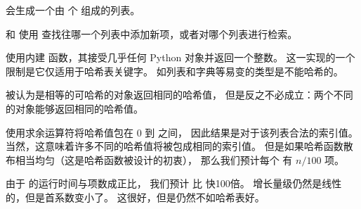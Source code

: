 
 会生成一个由  个  组成的列表。


 和  使用  查找往哪一个列表中添加新项，或者对哪个列表进行检索。



 使用内建  函数，其接受几乎任何 Python 对象并返回一个整数。
这一实现的一个限制是它仅适用于哈希表关键字。 如列表和字典等易变的类型是不能哈希的。


被认为是相等的可哈希的对象返回相同的哈希值，
但是反之不必成立：两个不同的对象能够返回相同的哈希值。


 使用求余运算符将哈希值包在 0 到  之间，
因此结果是对于该列表合法的索引值。 当然，这意味着许多不同的哈希值将被包成相同的索引值。 但是如果哈希函数散布相当均匀（这是哈希函数被设计的初衷）， 那么我们预计每个  有 $n/100$ 项。


由于  的运行时间与项数成正比，
我们预计  比  快100倍。
增长量级仍然是线性的，但是首系数变小了。 这很好，但是仍然不如哈希表好。

